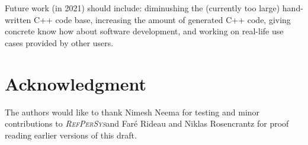 \documentclass{IEEEtran}
\newcommand{\RefPerSys}{{\textit{\textsc{RefPerSys}}}}
\begin{document}
Future work (in 2021) should include: diminushing the (currently too
large) hand-written C++ code base, increasing the amount of generated
C++ code, giving concrete know how about software development, and
working on real-life use cases provided by other users.





%



\section*{Acknowledgment}


The authors would like to thank Nimesh Neema for testing and minor
contributions to \RefPerSys and Faré Rideau and Niklas Rosencrantz for
proof reading earlier versions of this draft.


\ifCLASSOPTIONcaptionsoff
  \newpage
\fi



\end{document}
